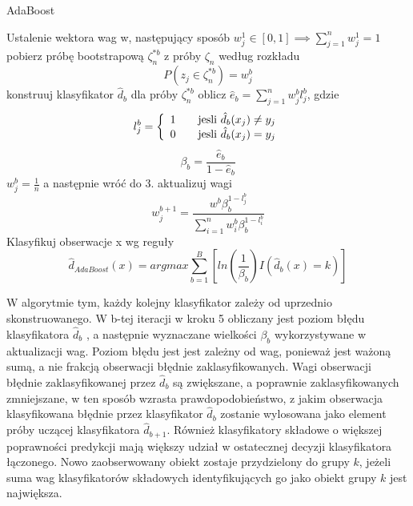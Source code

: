 \documentclass{classrep}
\begin{document}
\begin{algorithm}[h]
\caption{AdaBoost}
\label{adaboost}
\begin{algorithmic}[1]
\STATE Ustalenie wektora wag w, następujący sposób $w^{1} _{j} \in [0,1] \implies \sum \limits ^{n} _{j=1} w^{1} _{j} = 1$
\STATE pobierz próbę bootstrapową $\zeta ^{*b} _{n}$ z próby $\zeta _{n}$ według rozkładu 
\[ P(z_{j} \in \zeta ^{*b} _{n} ) = w ^{b} _j \]
\STATE konstruuj klasyfikator $\hat{d}_b$ dla próby  $\zeta ^{*b} _{n}$
\STATE oblicz $\hat{e} _{b} = \sum \limits ^{n} _{j=1} w^{b} _{j} l ^{b} _{j}$, gdzie
\[
l ^{b} _{j}  = \left\{ 
   \begin{array}{l l}
     1 & \quad \text{jesli $\hat{d}_b(x_j) \neq y_j$}\\
     0 & \quad \text{jesli $\hat{d}_b(x_j) = y_j$}\\
   \end{array} \right.
   \]
\STATE
\[
\beta _{b} = \frac{\hat{e} _{b}}{1 - \hat{e} _{b}}
\]
\ELSE
\STATE $w^{b} _{j} = \frac{1}{n}$ a następnie wróć do 3.
\ENDIF
\STATE aktualizuj wagi
\[
w^{b+1} _{j} = \frac{w^{b} \beta ^{1-l^{b} _{j}} _{b}}{\sum \limits ^{n} _{i=1} w ^{b} _{i} \beta ^{1-l ^{b} _{i}} _{b}}
\]
\ENDFOR
\STATE Klasyfikuj obserwacje x wg reguły
\[
\hat{d} _{AdaBoost} (x)= arg max \sum \limits ^{B} _{b=1} \left[ ln \left( \frac{1} {\beta _{b}}  \right) I \left( \hat{d}_b (x) = k \right) \right]
\]
\end{algorithmic}
\end{algorithm}


W algorytmie tym, każdy kolejny klasyfikator zależy od uprzednio skonstruowanego. W b-tej iteracji w kroku 5 obliczany jest poziom błędu klasyfikatora $\hat{d}_{b}$ , a następnie wyznaczane wielkości $\beta _b $ wykorzystywane w aktualizacji wag. Poziom błędu jest jest zależny od wag, ponieważ jest ważoną sumą, a nie frakcją obserwacji błędnie zaklasyfikowanych.  Wagi obserwacji błędnie zaklasyfikowanej przez $\hat{d}_{b}$ są zwiększane, a poprawnie zaklasyfikowanych zmniejszane, w ten sposób wzrasta prawdopodobieństwo, z jakim obserwacja klasyfikowana błędnie przez klasyfikator $\hat{d}_{b}$ zostanie wylosowana jako element próby uczącej klasyfikatora $\hat{d}_{b+1}$. Również klasyfikatory składowe o większej poprawności predykcji mają większy udział w ostatecznej decyzji klasyfikatora łączonego. Nowo zaobserwowany obiekt zostaje przydzielony do grupy $k$, jeżeli suma wag klasyfikatorów składowych identyfikujących go jako obiekt grupy $k$ jest największa.  
\end{document}
